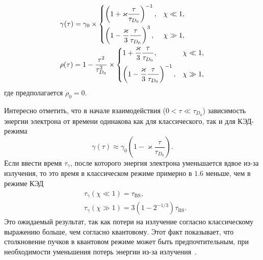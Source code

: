 \begin{align}
    \label{eq:ch3/gamma_const}
    &\gamma (\tau) = \gamma_0\times
        \begin{dcases}
            \left( 1 + \varkappa \frac{\tau}{\tau_{D_0}} \right)^{-1}, & \chi \ll 1, \\
            \left( 1 -  \frac{\varkappa }{3}\frac{\tau}{\tau_{D_0}}  \right)^{3}, &  \chi \gg 1,
        \end{dcases} \\
    \label{eq:ch3/rho_const}
    &\rho (\tau) =  1 - \frac{\tau^2 }{\tau_{D_0}^2} \times
        \begin{dcases}
            1 + \frac{\varkappa }{3}\frac{\tau}{\tau_{D_0}} , & \chi \ll 1, \\
            \left( 1 -  \frac{\varkappa }{3}\frac{\tau}{\tau_{D_0}}  \right)^{-1}, &  \chi \gg 1,
        \end{dcases}
\end{align}
где предполагается $\dot\rho_0 = 0$.

Интересно отметить, что в начале взаимодействия ($0<\tau \ll \tau_{D_0} $) зависимость энергии электрона от времени одинакова как для классического, так и для КЭД-режима
\begin{equation}
    \label{time_loss1}
    \gamma (\tau) \approx \gamma_0 \left( 1 -  \varkappa \frac{\tau } {\tau_{D_0}}  \right).
\end{equation}
Если ввести время $\tau_{\gamma}$, после которого энергия электрона уменьшается вдвое из-за излучения, то это время в классическом режиме примерно в $1.6$ меньше, чем в режиме КЭД
\begin{align}
    \label{time_loss2}
    &\tau_{\gamma} (\chi \ll 1) =  \tau_\mathrm{BS} , \\ 
    &\tau_{\gamma} (\chi \gg 1) =   3 \left( 1 - 2^{-1/3} \right) \tau_\mathrm{BS}.
\end{align}  
Это ожидаемый результат, так как потери на излучение согласно классическому выражению больше, чем согласно квантовому.
Этот факт показывает, что столкновение пучков в квантовом режиме может быть предпочтительным, при необходимости уменьшения потерь энергии из-за излучения~\cite{xie1998quantum}.

